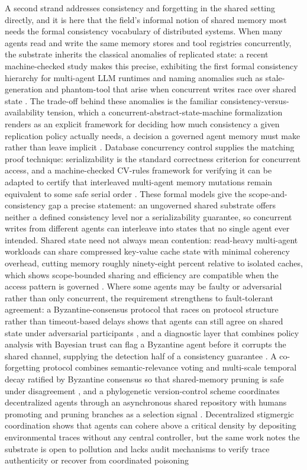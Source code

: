A second strand addresses consistency and forgetting in the shared setting directly, and it is here that the field's informal notion of shared memory most needs the formal consistency vocabulary of distributed systems. When many agents read and write the same memory stores and tool registries concurrently, the substrate inherits the classical anomalies of replicated state: a recent machine-checked study makes this precise, exhibiting the first formal consistency hierarchy for multi-agent LLM runtimes and naming anomalies such as stale-generation and phantom-tool that arise when concurrent writes race over shared state \citep{khan2026concurrency}. The trade-off behind these anomalies is the familiar consistency-versus-availability tension, which a concurrent-abstract-state-machine formalization renders as an explicit framework for deciding how much consistency a given replication policy actually needs, a decision a governed agent memory must make rather than leave implicit \citep{schewe2019replicated}. Database concurrency control supplies the matching proof technique: serializability is the standard correctness criterion for concurrent access, and a machine-checked CV-rules framework for verifying it can be adapted to certify that interleaved multi-agent memory mutations remain equivalent to some safe serial order \citep{hoshino2026cv-rules}. These formal models give the scope-and-consistency gap a precise statement: an ungoverned shared substrate offers neither a defined consistency level nor a serializability guarantee, so concurrent writes from different agents can interleave into states that no single agent ever intended. Shared state need not always mean contention: read-heavy multi-agent workloads can share compressed key-value cache state with minimal coherency overhead, cutting memory roughly ninety-eight percent relative to isolated caches, which shows scope-bounded sharing and efficiency are compatible when the access pattern is governed \citep{patel2026polykv}. Where some agents may be faulty or adversarial rather than only concurrent, the requirement strengthens to fault-tolerant agreement: a Byzantine-consensus protocol that races on protocol structure rather than timeout-based delays shows that agents can still agree on shared state under adversarial participants \citep{giridharan2026ambulance}, and a diagnostic layer that combines policy analysis with Bayesian trust can flag a Byzantine agent before it corrupts the shared channel, supplying the detection half of a consistency guarantee \citep{murimi2026bard}. A co-forgetting protocol combines semantic-relevance voting and multi-scale temporal decay ratified by Byzantine consensus so that shared-memory pruning is safe under disagreement \citep{bach2025coforgetting}, and a phylogenetic version-control scheme coordinates decentralized agents through an asynchronous shared repository with humans promoting and pruning branches as a selection signal \citep{huang2025evogit}. Decentralized stigmergic coordination shows that agents can cohere above a critical density by depositing environmental traces without any central controller, but the same work notes the substrate is open to pollution and lacks audit mechanisms to verify trace authenticity or recover from coordinated poisoning 